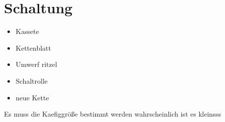 \chapter{Schaltung}

\begin{itemize}
    \item Kassete
    \item Kettenblatt
    \item Umwerf ritzel
    \item Schaltrolle
    \item neue Kette
\end{itemize}

Es muss die Kaefiggröße bestimmt werden 
wahrscheinlich ist es kleinsss